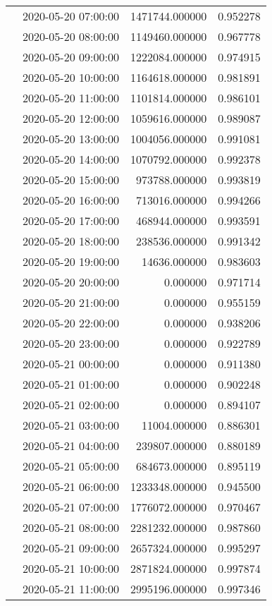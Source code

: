 \begin{tabular}{llrr}
 & 2020-05-20 07:00:00 & 1471744.000000 & 0.952278 \\
 & 2020-05-20 08:00:00 & 1149460.000000 & 0.967778 \\
 & 2020-05-20 09:00:00 & 1222084.000000 & 0.974915 \\
 & 2020-05-20 10:00:00 & 1164618.000000 & 0.981891 \\
 & 2020-05-20 11:00:00 & 1101814.000000 & 0.986101 \\
 & 2020-05-20 12:00:00 & 1059616.000000 & 0.989087 \\
 & 2020-05-20 13:00:00 & 1004056.000000 & 0.991081 \\
 & 2020-05-20 14:00:00 & 1070792.000000 & 0.992378 \\
 & 2020-05-20 15:00:00 & 973788.000000 & 0.993819 \\
 & 2020-05-20 16:00:00 & 713016.000000 & 0.994266 \\
 & 2020-05-20 17:00:00 & 468944.000000 & 0.993591 \\
 & 2020-05-20 18:00:00 & 238536.000000 & 0.991342 \\
 & 2020-05-20 19:00:00 & 14636.000000 & 0.983603 \\
 & 2020-05-20 20:00:00 & 0.000000 & 0.971714 \\
 & 2020-05-20 21:00:00 & 0.000000 & 0.955159 \\
 & 2020-05-20 22:00:00 & 0.000000 & 0.938206 \\
 & 2020-05-20 23:00:00 & 0.000000 & 0.922789 \\
 & 2020-05-21 00:00:00 & 0.000000 & 0.911380 \\
 & 2020-05-21 01:00:00 & 0.000000 & 0.902248 \\
 & 2020-05-21 02:00:00 & 0.000000 & 0.894107 \\
 & 2020-05-21 03:00:00 & 11004.000000 & 0.886301 \\
 & 2020-05-21 04:00:00 & 239807.000000 & 0.880189 \\
 & 2020-05-21 05:00:00 & 684673.000000 & 0.895119 \\
 & 2020-05-21 06:00:00 & 1233348.000000 & 0.945500 \\
 & 2020-05-21 07:00:00 & 1776072.000000 & 0.970467 \\
 & 2020-05-21 08:00:00 & 2281232.000000 & 0.987860 \\
 & 2020-05-21 09:00:00 & 2657324.000000 & 0.995297 \\
 & 2020-05-21 10:00:00 & 2871824.000000 & 0.997874 \\
 & 2020-05-21 11:00:00 & 2995196.000000 & 0.997346 \\

\end{tabular}
